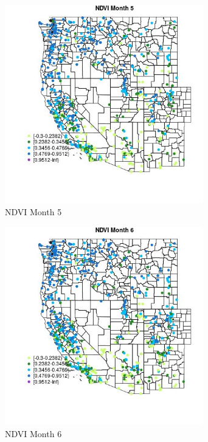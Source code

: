 \begin{figure} 
\centering  
\includegraphics[width=0.77\textwidth]{Code_Outputs/Report_ML_input_PM25_Step4_part_f_de_duplicated_aves_prioritize_24hr_obswNAs_MapObsMo5NDVI.jpg} 
\caption{\label{fig:Report_ML_input_PM25_Step4_part_f_de_duplicated_aves_prioritize_24hr_obswNAsMapObsMo5NDVI}NDVI Month 5} 
\end{figure} 
 

\begin{figure} 
\centering  
\includegraphics[width=0.77\textwidth]{Code_Outputs/Report_ML_input_PM25_Step4_part_f_de_duplicated_aves_prioritize_24hr_obswNAs_MapObsMo6NDVI.jpg} 
\caption{\label{fig:Report_ML_input_PM25_Step4_part_f_de_duplicated_aves_prioritize_24hr_obswNAsMapObsMo6NDVI}NDVI Month 6} 
\end{figure} 
 


